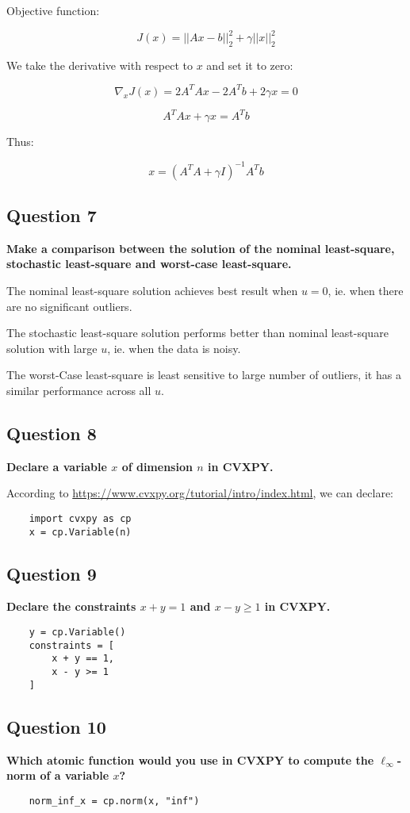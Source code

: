 Objective function: 

$$ J(x) = ||Ax - b||_2^2 + \gamma ||x||_2^2 $$

We take the derivative with respect to $x$ and set it to zero: 

$$ \nabla_x J(x) = 2 A^T A x - 2 A^T b + 2 \gamma x = 0 $$

$$ A^T A x + \gamma x = A^T b $$

Thus: 

$$ x = (A^T A + \gamma I)^{-1} A^T b $$


\subsection*{Question 7}
\textbf{Make a comparison between the solution of the nominal least-square, stochastic least-square and worst-case least-square.}

The nominal least-square solution achieves best result when $u=0$, ie. when there are no significant outliers.

The stochastic least-square solution performs better than nominal least-square solution with large $u$, ie. when the data is noisy.

The worst-Case least-square is least sensitive to large number of outliers, it has a similar performance across all $u$.

\subsection*{Question 8}
\textbf{Declare a variable $x$ of dimension $n$ in CVXPY.}

According to \href{https://www.cvxpy.org/tutorial/intro/index.html}{https://www.cvxpy.org/tutorial/intro/index.html}, we can declare: 

\begin{lstlisting}
    import cvxpy as cp
    x = cp.Variable(n)
\end{lstlisting}


\subsection*{Question 9}
\textbf{Declare the constraints \( x + y = 1 \) and \( x - y \geq 1 \) in CVXPY.}



\begin{lstlisting}
    y = cp.Variable()
    constraints = [
        x + y == 1,
        x - y >= 1
    ]
\end{lstlisting}


\subsection*{Question 10}
\textbf{Which atomic function would you use in CVXPY to compute the $\ell_\infty$-norm of a variable $x$?}

\begin{lstlisting}
    norm_inf_x = cp.norm(x, "inf")
\end{lstlisting}